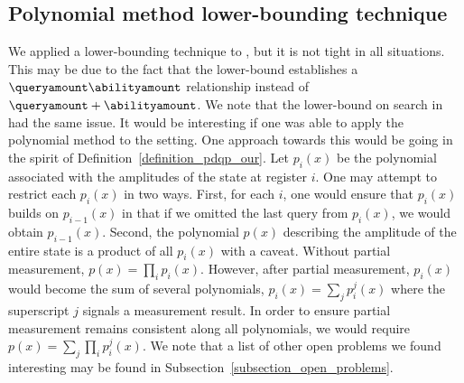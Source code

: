 \subsection{Polynomial method lower-bounding technique}\label{subsection_polynomial_method}

We applied a \bqpname lower-bounding technique to \pdqpname, but it is not tight in all situations. This may be due to the fact that the lower-bound establishes a $\queryamount\abilityamount$ relationship instead of $\queryamount+\abilityamount$. We note that the lower-bound on search in~\cite{space_above_bqp} had the same issue. It would be interesting if one was able to apply the polynomial method to the setting. One approach towards this would be going in the spirit of Definition~\ref{definition_pdqp_our}. Let $p_i(x)$ be the polynomial associated with the amplitudes of the state at register $i$. One may attempt to restrict each $p_i(x)$ in two ways. First, for each $i$, one would ensure that $p_i(x)$ builds on $p_{i-1}(x)$ in that if we omitted the last query from $p_i(x)$, we would obtain $p_{i-1}(x)$. Second, the polynomial $p(x)$ describing the amplitude of the entire state is a product of all $p_i(x)$ with a caveat. Without partial measurement, $p(x)=\prod_i p_i(x)$. However, after partial measurement, $p_i(x)$ would become the sum of several polynomials, $p_i(x)=\sum_j p_i^j(x)$ where the superscript $j$ signals a measurement result. In order to ensure partial measurement remains consistent along all polynomials, we would require $p(x)=\sum_j \prod_i p_i^j(x)$. We note that a list of other open problems we found interesting may be found in Subsection~\ref{subsection_open_problems}.



